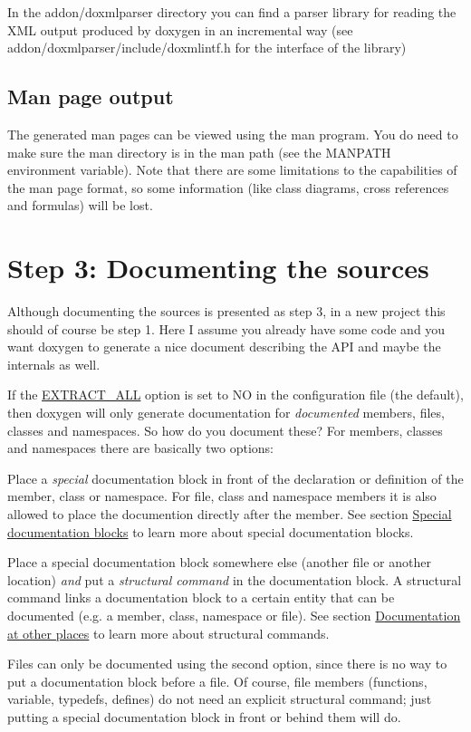 In the addon/doxmlparser directory you can find a parser library for reading the XML output produced by doxygen in an incremental way (see addon/doxmlparser/include/doxmlintf.h for the interface of the library)\hypertarget{starting_man_out}{}\subsection{Man page output}\label{starting_man_out}
The generated man pages can be viewed using the {\ttfamily man} program. You do need to make sure the man directory is in the man path (see the {\ttfamily MANPATH} environment variable). Note that there are some limitations to the capabilities of the man page format, so some information (like class diagrams, cross references and formulas) will be lost.\hypertarget{starting_step3}{}\section{Step 3: Documenting the sources}\label{starting_step3}
Although documenting the sources is presented as step 3, in a new project this should of course be step 1. Here I assume you already have some code and you want doxygen to generate a nice document describing the API and maybe the internals as well.

If the \hyperlink{config_cfg_extract_all}{EXTRACT\_\-ALL} option is set to {\ttfamily NO} in the configuration file (the default), then doxygen will only generate documentation for {\itshape documented\/} members, files, classes and namespaces. So how do you document these? For members, classes and namespaces there are basically two options: 
\begin{DoxyEnumerate}
\item Place a {\itshape special\/} documentation block in front of the declaration or definition of the member, class or namespace. For file, class and namespace members it is also allowed to place the documention directly after the member. See section \hyperlink{docblocks_specialblock}{Special documentation blocks} to learn more about special documentation blocks. 
\item Place a special documentation block somewhere else (another file or another location) {\itshape and\/} put a {\itshape structural command\/} in the documentation block. A structural command links a documentation block to a certain entity that can be documented (e.g. a member, class, namespace or file). See section \hyperlink{docblocks_structuralcommands}{Documentation at other places} to learn more about structural commands. 
\end{DoxyEnumerate}Files can only be documented using the second option, since there is no way to put a documentation block before a file. Of course, file members (functions, variable, typedefs, defines) do not need an explicit structural command; just putting a special documentation block in front or behind them will do.

